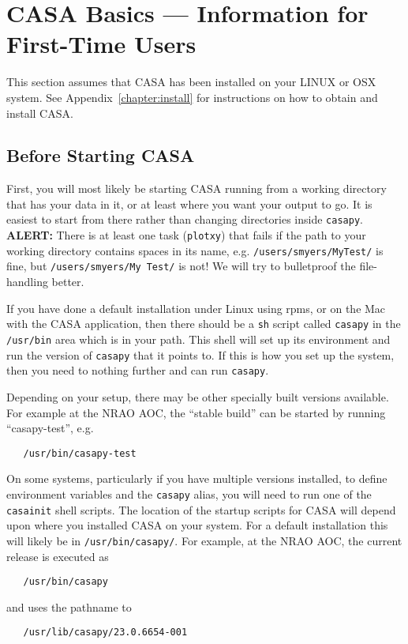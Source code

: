 
\section{CASA Basics --- Information for First-Time Users}
\label{section:intro.basics}

This section assumes that CASA has been installed on your LINUX or OSX
system.  See Appendix~\ref{chapter:install} for instructions on how to 
obtain and install CASA.  

\subsection{Before Starting CASA}
\label{section:intro.basics.before}

First, you will most likely be starting CASA running from a working
directory that has your data in it, or at least where you want your
output to go.  It is easiest to start from there rather than changing
directories inside {\tt casapy}.
{\bf ALERT:} There is at least one task ({\tt plotxy}) that 
fails if the path to your working directory contains spaces in
its name, e.g. {\tt /users/smyers/MyTest/} is fine, but 
{\tt /users/smyers/My\ Test/} is not!  We will try to bulletproof the
file-handling better.

If you have done a default installation under Linux using rpms, or 
on the Mac with the CASA application, then there should be a {\tt sh}
script called {\tt casapy} in the {\tt /usr/bin} area which is in
your path.  This shell will set up its environment and run the version
of {\tt casapy} that it points to.  If this is how you set up the
system, then you need to nothing further and can run {\tt casapy}.

Depending on your setup, there may be other specially built versions
available. For example at the NRAO AOC, the ``stable build'' can be
started by running ``casapy-test'', e.g.
\small
\begin{verbatim}
   /usr/bin/casapy-test
\end{verbatim}
\normalsize

On some systems, particularly if you have multiple versions installed,
to define environment variables and the {\tt casapy} alias, you will
need to run one of the {\tt casainit} shell scripts.
The location of the startup scripts for CASA will depend upon where
you installed CASA on your system.  For a default installation
this will likely be in {\tt /usr/bin/casapy/}.  
For example, at the NRAO AOC, the current release is executed as
\small
\begin{verbatim}
   /usr/bin/casapy
\end{verbatim}
\normalsize
and uses the pathname to
\small
\begin{verbatim}
   /usr/lib/casapy/23.0.6654-001
\end{verbatim}
\normalsize

